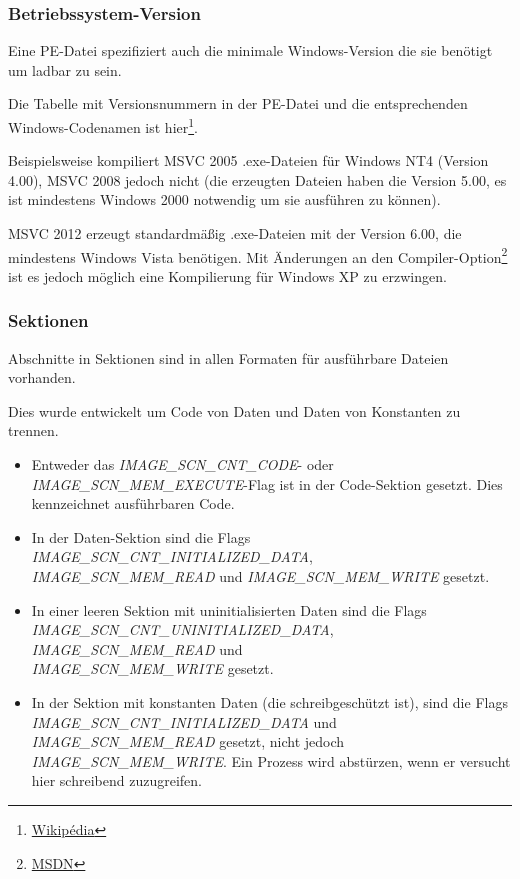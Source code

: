 \subsubsection{Betriebssystem-Version}

Eine PE-Datei spezifiziert auch die minimale Windows-Version die sie benötigt um
ladbar zu sein.

Die Tabelle mit Versionsnummern in der PE-Datei und die entsprechenden Windows-Codenamen
ist hier\footnote{\href{https://en.wikipedia.org/wiki/Windows_NT#Releases}{Wikipédia}}.

Beispielsweise kompiliert \ac{MSVC} 2005 .exe-Dateien für Windows NT4 (Version 4.00),
\ac{MSVC} 2008 jedoch nicht (die erzeugten Dateien haben die Version 5.00, es ist
mindestens Windows 2000 notwendig um sie ausführen zu können).


\ac{MSVC} 2012 erzeugt standardmäßig .exe-Dateien mit der Version 6.00, die mindestens
Windows Vista benötigen.
Mit Änderungen an den Compiler-Option\footnote{\href{http://blogs.msdn.com/b/vcblog/archive/2012/10/08/10357555.aspx}{MSDN}}
ist es jedoch möglich eine Kompilierung für Windows XP zu erzwingen.

\subsubsection{Sektionen}

Abschnitte in Sektionen sind in allen Formaten für ausführbare Dateien vorhanden.

Dies wurde entwickelt um Code von Daten und Daten von Konstanten zu trennen.

\begin{itemize}
\item Entweder das \emph{IMAGE\_SCN\_CNT\_CODE}- oder \emph{IMAGE\_SCN\_MEM\_EXECUTE}-Flag
ist in der Code-Sektion gesetzt. Dies kennzeichnet ausführbaren Code.

\item In der Daten-Sektion sind die Flags \emph{IMAGE\_SCN\_CNT\_INITIALIZED\_DATA},\\
\emph{IMAGE\_SCN\_MEM\_READ} und \emph{IMAGE\_SCN\_MEM\_WRITE} gesetzt.

\item In einer leeren Sektion mit uninitialisierten Daten sind die Flags\\
\emph{IMAGE\_SCN\_CNT\_UNINITIALIZED\_DATA}, \emph{IMAGE\_SCN\_MEM\_READ} und\\
\emph{IMAGE\_SCN\_MEM\_WRITE} gesetzt.

\item In der Sektion mit konstanten Daten (die schreibgeschützt ist), sind die
Flags \emph{IMAGE\_SCN\_CNT\_INITIALIZED\_DATA} und \emph{IMAGE\_SCN\_MEM\_READ}
gesetzt, nicht jedoch \emph{IMAGE\_SCN\_MEM\_WRITE}.
Ein Prozess wird abstürzen, wenn er versucht hier schreibend zuzugreifen.

\end{itemize}

